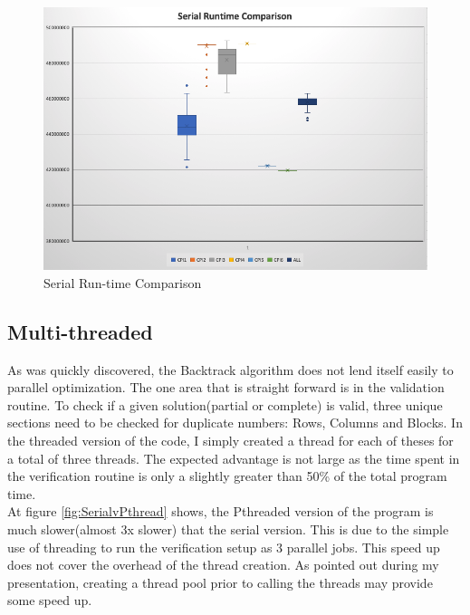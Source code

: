 \documentclass[11pt, a4paper]{article} %
\begin{document}
\begin{figure}
  \includegraphics[width=\linewidth]{SerialRuntimeComparison.png}
  \caption{Serial Run-time Comparison}
  \label{fig:Serial Run-time Comparison}
\end{figure}
\subsection{Multi-threaded}
As was quickly discovered, the Backtrack algorithm does not lend itself easily to parallel optimization.  The one area that is straight forward is in the validation routine. To check if a given solution(partial or complete) is valid, three unique sections need to be checked for duplicate numbers: Rows, Columns and Blocks. In the threaded version of the code, I simply created a thread for each of theses for a total of three threads. The expected advantage is not large as the time spent in the verification routine is only a slightly greater than 50\% of the total program time. \\
At figure \ref{fig:SerialvPthread} shows, the Pthreaded version of the program is much slower(almost 3x slower) that the serial version.  This is due to the simple use of threading to run the verification setup as 3 parallel jobs. This speed up does not cover the overhead of the thread creation.  As pointed out during my presentation, creating a thread pool prior to calling the threads may provide some speed up.
\end{document}
